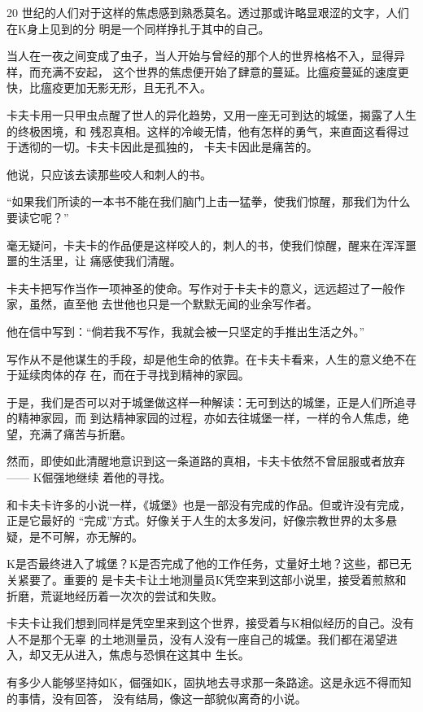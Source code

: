 		20 世纪的人们对于这样的焦虑感到熟悉莫名。透过那或许略显艰涩的文字，人们在K身上见到的分
	明是一个同样挣扎于其中的自己。

		当人在一夜之间变成了虫子，当人开始与曾经的那个人的世界格格不入，显得异样，而充满不安起，
	这个世界的焦虑便开始了肆意的蔓延。比瘟疫蔓延的速度更快，比瘟疫更加无影无形，且无孔不入。

		卡夫卡用一只甲虫点醒了世人的异化趋势，又用一座无可到达的城堡，揭露了人生的终极困境，和
	残忍真相。这样的冷峻无情，他有怎样的勇气，来直面这看得过于透彻的一切。卡夫卡因此是孤独的，
	卡夫卡因此是痛苦的。

		他说，只应该去读那些咬人和刺人的书。

		“如果我们所读的一本书不能在我们脑门上击一猛拳，使我们惊醒，那我们为什么要读它呢？”

		毫无疑问，卡夫卡的作品便是这样咬人的，刺人的书，使我们惊醒，醒来在浑浑噩噩的生活里，让
	痛感使我们清醒。

		卡夫卡把写作当作一项神圣的使命。写作对于卡夫卡的意义，远远超过了一般作家，虽然，直至他
	去世他也只是一个默默无闻的业余写作者。

		他在信中写到：“倘若我不写作，我就会被一只坚定的手推出生活之外。”

		写作从不是他谋生的手段，却是他生命的依靠。在卡夫卡看来，人生的意义绝不在于延续肉体的存
	在，而在于寻找到精神的家园。

		于是，我们是否可以对于城堡做这样一种解读：无可到达的城堡，正是人们所追寻的精神家园，而
	到达精神家园的过程，亦如去往城堡一样，一样的令人焦虑，绝望，充满了痛苦与折磨。

		然而，即使如此清醒地意识到这一条道路的真相，卡夫卡依然不曾屈服或者放弃 —— K倔强地继续
	着他的寻找。

		和卡夫卡许多的小说一样，《城堡》也是一部没有完成的作品。但或许没有完成，正是它最好的
	“完成”方式。好像关于人生的太多发问，好像宗教世界的太多悬疑，是不可解，亦无解的。

		K是否最终进入了城堡？K是否完成了他的工作任务，丈量好土地？这些，都已无关紧要了。重要的
	是卡夫卡让土地测量员K凭空来到这部小说里，接受着煎熬和折磨，荒诞地经历着一次次的尝试和失败。

		卡夫卡让我们想到同样是凭空里来到这个世界，接受着与K相似经历的自己。没有人不是那个无辜
	的土地测量员，没有人没有一座自己的城堡。我们都在渴望进入，却又无从进入，焦虑与恐惧在这其中
	生长。

		有多少人能够坚持如K，倔强如K，固执地去寻求那一条路途。这是永远不得而知的事情，没有回答，
	没有结局，像这一部貌似离奇的小说。

